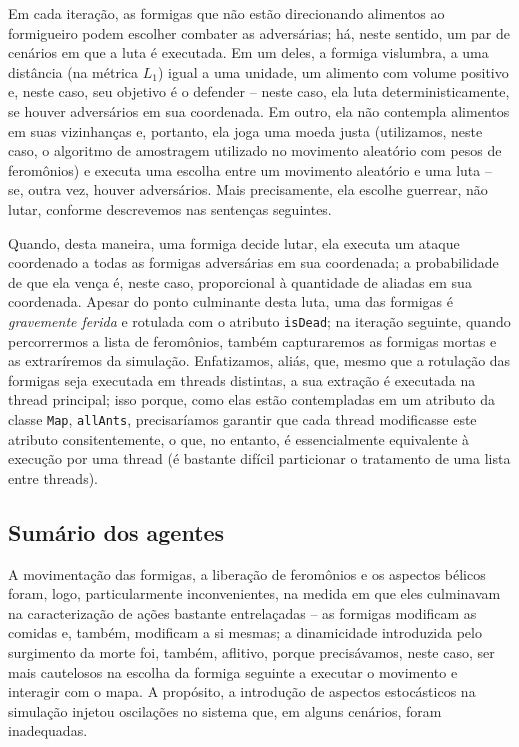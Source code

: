 \documentclass[12pt]{article}
\theoremstyle{definition}
\begin{document}
Em cada iteração, as formigas que não estão direcionando alimentos ao formigueiro podem escolher combater as adversárias; há, neste sentido, um par de cenários em que a luta é executada. Em um deles, a formiga vislumbra, a uma distância (na métrica $L_{1}$) igual a uma unidade, um alimento com volume positivo e, neste caso, seu objetivo é o defender -- neste caso, ela luta deterministicamente, se houver adversários em sua coordenada. Em outro, ela não contempla alimentos em suas vizinhanças e, portanto, ela joga uma moeda justa (utilizamos, neste caso, o algoritmo de amostragem utilizado no movimento aleatório com pesos de feromônios) e executa uma escolha entre um movimento aleatório e uma luta -- se, outra vez, houver adversários. Mais precisamente, ela escolhe guerrear, não lutar, conforme descrevemos nas sentenças seguintes. 

Quando, desta maneira, uma formiga decide lutar, ela executa um ataque coordenado a todas as formigas adversárias em sua coordenada; a probabilidade de que ela vença é, neste caso, proporcional à quantidade de aliadas em sua coordenada. Apesar do ponto culminante desta luta, uma das formigas é \textit{gravemente ferida} e rotulada com o atributo \texttt{isDead}; na iteração seguinte, quando percorrermos a lista de feromônios, também capturaremos as formigas mortas e as extraríremos da simulação. Enfatizamos, aliás, que, mesmo que a rotulação das formigas seja executada em threads distintas, a sua extração é executada na thread principal; isso porque, como elas estão contempladas em um atributo da classe \texttt{Map}, \texttt{allAnts}, precisaríamos garantir que cada thread modificasse este atributo consitentemente, o que, no entanto, é essencialmente equivalente à execução por uma thread (é bastante difícil particionar o tratamento de uma lista entre threads). 

\subsection{Sumário dos agentes} 

A movimentação das formigas, a liberação de feromônios e os aspectos bélicos foram, logo, particularmente inconvenientes, na medida em que eles culminavam na caracterização de ações bastante entrelaçadas -- as formigas modificam as comidas e, também, modificam a si mesmas; a dinamicidade introduzida pelo surgimento da morte foi, também, aflitivo, porque precisávamos, neste caso, ser mais cautelosos na escolha da formiga seguinte a executar o movimento e interagir com o mapa. A propósito, a introdução de aspectos estocásticos na simulação injetou oscilações no sistema que, em alguns cenários, foram inadequadas. 
\end{document}
